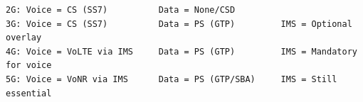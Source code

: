 
\def\CNcodelang{}

\begin{CNplaincode}
\begin{Verbatim}
2G: Voice = CS (SS7)          Data = None/CSD
3G: Voice = CS (SS7)          Data = PS (GTP)         IMS = Optional overlay
4G: Voice = VoLTE via IMS     Data = PS (GTP)         IMS = Mandatory for voice
5G: Voice = VoNR via IMS      Data = PS (GTP/SBA)     IMS = Still essential
\end{Verbatim}
\end{CNplaincode}



